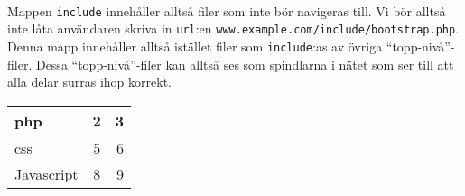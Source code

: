 \documentclass[12pt]{article}
\begin{document}
\paragraph{}
Mappen \texttt{include} innehåller alltså filer som inte bör navigeras till. Vi bör alltså inte låta användaren skriva in \texttt{url}:en \texttt{www.example.com/include/bootstrap.php}. Denna mapp innehåller alltså istället filer som \texttt{include}:as av övriga ``topp-nivå''-filer. Dessa ``topp-nivå''-filer kan alltså ses som spindlarna i nätet som ser till att alla delar surras ihop korrekt.




\begin{tabular}{ l | c | r }
  php & 2 & 3 \\ \hline
  css & 5 & 6 \\ \hline
  Javascript & 8 & 9 \\
\end{tabular}
\end{document}
